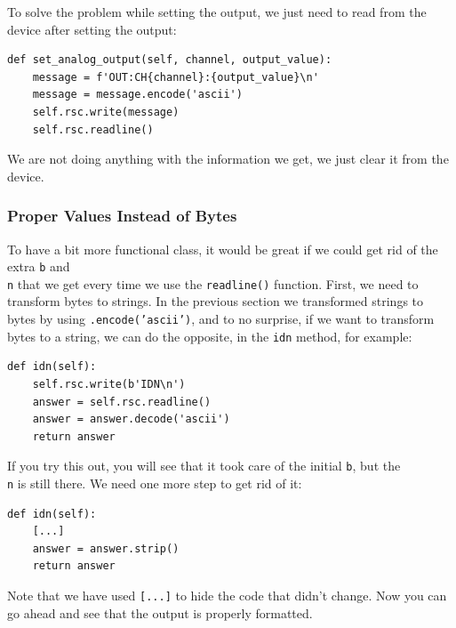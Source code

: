 To solve the problem while setting the output, we just need to read from the device after setting the output:

\begin{verbatim}
def set_analog_output(self, channel, output_value):
    message = f'OUT:CH{channel}:{output_value}\n'
    message = message.encode('ascii')
    self.rsc.write(message)
    self.rsc.readline()
\end{verbatim}

We are not doing anything with the information we get, we just clear it from the device. 

\subsubsection{Proper Values Instead of Bytes}
To have a bit more functional class, it would be great if we could get rid of the extra \texttt{b} and \texttt{\\n} that we get every time we use the \texttt{readline()} function. First, we need to transform bytes to strings. In the previous section we transformed strings to bytes by using \texttt{.encode('ascii')}, and to no surprise, if we want to transform bytes to a string, we can do the opposite, in the \texttt{idn} method, for example:

\begin{verbatim}
def idn(self):
    self.rsc.write(b'IDN\n')
    answer = self.rsc.readline()
    answer = answer.decode('ascii')
    return answer
\end{verbatim}

If you try this out, you will see that it took care of the initial \texttt{b}, but the \texttt{\\n} is still there. We need one more step to get rid of it:

\begin{verbatim}
def idn(self):
    [...]
    answer = answer.strip()
    return answer
\end{verbatim}

Note that we have used \texttt{[...]} to hide the code that didn't change. Now you can go ahead and see that the output is properly formatted. 


